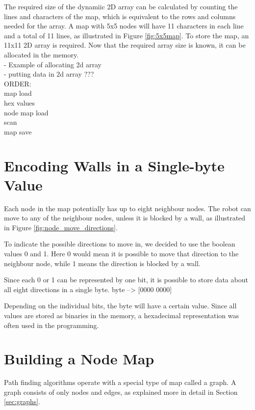 The required size of the dynamiic 2D array can be calculated by counting the lines and characters of the map,
which is equivalent to the rows and columns needed for the array.
A map with 5x5 nodes will have 11 characters in each line and a total of 11 lines,
as illustrated in Figure \ref{fig:5x5map}.
To store the map, an 11x11 2D array is required.
Now that the required array size is known, it can be allocated in the memory.\\
- Example of allocating 2d array\\
- putting data in 2d array ???\\

ORDER:\\
map load\\
hex values\\
node map load\\
scan\\
map save


\section{Encoding Walls in a Single-byte Value}
\label{sec:map_hex} %
Each node in the map potentially has up to eight neighbour nodes. 
The robot can move to any of the neighbour nodes, unless it is blocked by a wall, as illustrated in Figure \ref{fig:node_move_directions}.

To indicate the possible directions to move in, we decided to use the boolean values 0 and 1. 
Here 0 would mean it is possible to move that direction to the neighbour node, while 1 means the direction is blocked by a wall.

Since each 0 or 1 can be represented by one bit, it is possible to store data about all eight directions in a single byte.
byte --> [0000 0000] 

Depending on the individual bits, the byte will have a certain value.
Since all values are stored as binaries in the memory, a hexadecimal representation was often used in the programming.



\section{Building a Node Map}
\label{sec:map_node} %
Path finding algorithms operate with a special type of map called a graph.
A graph consists of only nodes and edges, as explained more in detail in Section \ref{sec:graphs}.

